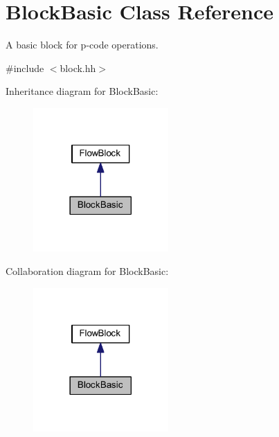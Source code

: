 \hypertarget{class_block_basic}{}\section{Block\+Basic Class Reference}
\label{class_block_basic}


A basic block for p-\/code operations.  




{\ttfamily \#include $<$block.\+hh$>$}



Inheritance diagram for Block\+Basic\+:
\nopagebreak
\begin{figure}[H]
\begin{center}
\leavevmode
\includegraphics[width=146pt]{class_block_basic__inherit__graph}
\end{center}
\end{figure}


Collaboration diagram for Block\+Basic\+:
\nopagebreak
\begin{figure}[H]
\begin{center}
\leavevmode
\includegraphics[width=146pt]{class_block_basic__coll__graph}
\end{center}
\end{figure}
